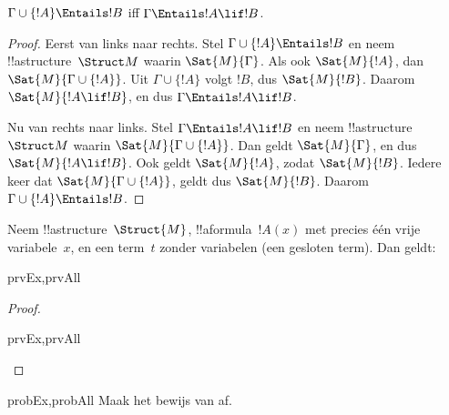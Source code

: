 \documentclass[../../../include/open-logic-section]{subfiles}
\begin{document}
\begin{thm}
$\Gamma \cup \{!A\} \Entails !B$ iff $\Gamma \Entails !A \lif !B$.
\end{thm}

\begin{proof}
Eerst van links naar rechts. Stel
$\Gamma \cup \{ !A \} \Entails !B$ en neem !!a{structure}~$\Struct M$
waarin $\Sat{M}{\Gamma}$. Als ook $\Sat{M}{!A}$, dan
$\Sat{M}{\Gamma \cup \{ !A \} }$. Uit
$\Gamma \cup \{ !A \}$ volgt $!B$, dus $\Sat{M}{!B}$. Daarom
$\Sat{M}{!A \lif !B}$, en dus
$\Gamma \Entails !A \lif !B$.

Nu van rechts naar links. Stel $\Gamma \Entails !A \lif !B$ en neem
!!a{structure}~$\Struct M$ waarin
$\Sat{M}{\Gamma \cup \{ !A \}}$. Dan geldt $\Sat{M}{\Gamma}$, en dus
$\Sat{M}{!A \lif !B}$. Ook geldt $\Sat{M}{!A}$, zodat
$\Sat{M}{!B}$. Iedere keer dat
$\Sat{M}{\Gamma \cup \{ !A \} }$, geldt dus $\Sat{M}{!B}$. Daarom
$\Gamma \cup \{ !A \} \Entails !B$.
\end{proof}

\begin{prop}
  Neem !!a{structure}~$\Struct{M}$, !!a{formula}~$!A(x)$ met precies
  één vrije variabele~$x$, en een term~$t$ zonder variabelen (een
  gesloten term). Dan geldt:
  \begin{tagenumerate}{prvEx,prvAll}
  \end{tagenumerate}
\end{prop}

\begin{proof}
  \begin{tagenumerate}{prvEx,prvAll}
  \end{tagenumerate}
\end{proof}

\begin{probtag}{probEx,probAll}
  Maak het bewijs van  af.
\end{probtag} 
\end{document}
